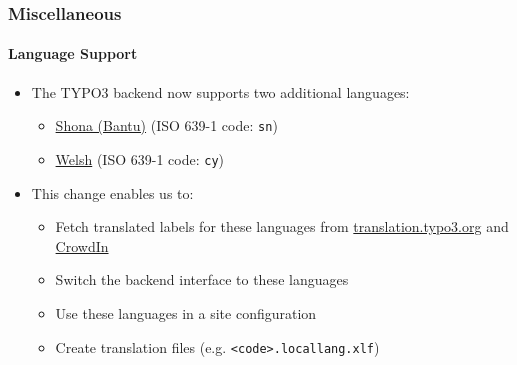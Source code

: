 %

\begin{frame}[fragile]
	\frametitle{Miscellaneous}
	\framesubtitle{Language Support}

	\begin{itemize}
		\item The TYPO3 backend now supports two additional languages:
			\begin{itemize}
				\item \href{https://en.wikipedia.org/wiki/Shona_language}{Shona (Bantu)}
					(ISO 639-1 code: \texttt{sn})
				\item \href{https://en.wikipedia.org/wiki/Welsh_language}{Welsh}
					(ISO 639-1 code: \texttt{cy})
			\end{itemize}
			\vspace{0.2cm}
		\item This change enables us to:
			\begin{itemize}
				\item Fetch translated labels for these languages from\newline
					\href{https://translation.typo3.org}{translation.typo3.org}
					and
					\href{https://crowdin.com}{CrowdIn}
				\item Switch the backend interface to these languages
				\item Use these languages in a site configuration
				\item Create translation files (e.g. \texttt{<code>.locallang.xlf})
			\end{itemize}

	\end{itemize}

\end{frame}

